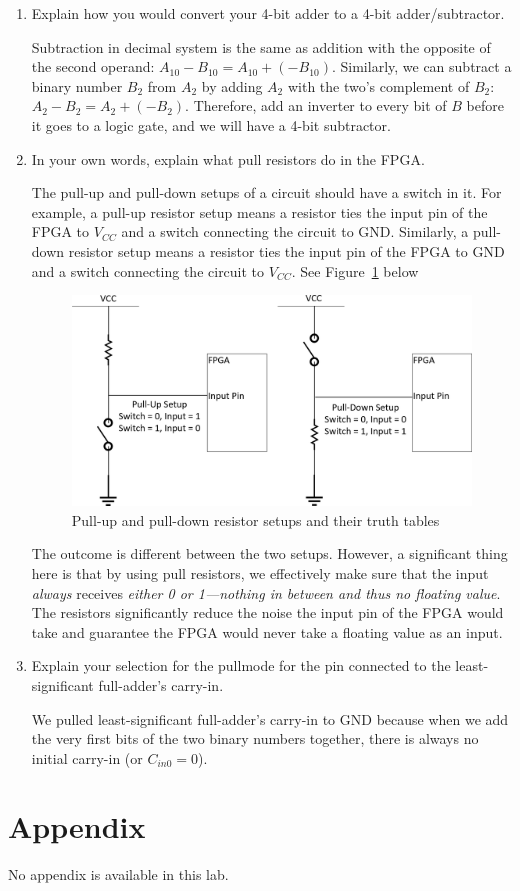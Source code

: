 \documentclass[12pt]{article}
\begin{document}
\begin{enumerate}
  \item Explain how you would convert your 4-bit adder to a 4-bit adder/subtractor.

  Subtraction in decimal system is the same as addition with the opposite of the second operand: $A_{10} - B_{10} = A_{10} + (-B_{10})$. Similarly, we can subtract a binary number $B_2$ from $A_2$ by adding $A_2$ with the two's complement of $B_2$: $A_2 - B_2 = A_2 + (-B_2)$. Therefore, add an inverter to every bit of $B$ before it goes to a logic gate, and we will have a 4-bit subtractor.

  \item In your own words, explain what pull resistors do in the FPGA.

  The pull-up and pull-down setups of a circuit should have a switch in it. For example, a pull-up resistor setup means a resistor ties the input pin of the FPGA to $V_{CC}$ and a switch connecting the circuit to GND. Similarly, a pull-down resistor setup means a resistor ties the input pin of the FPGA to GND and a switch connecting the circuit to $V_{CC}$. See Figure~\ref{figure:5} below

  \begin{figure}[h]
    \centering
    \includegraphics[width=\textwidth]{pull_resistor_setups.png}
    \caption{Pull-up and pull-down resistor setups and their truth tables}
    \label{figure:5}
  \end{figure}

  The outcome is different between the two setups. However, a significant thing here is that by using pull resistors, we effectively make sure that the input \textit{always} receives \textit{either 0 or 1---nothing in between and thus no floating value}. The resistors significantly reduce the noise the input pin of the FPGA would take and guarantee the FPGA would never take a floating value as an input.

  \item Explain your selection for the pullmode for the pin connected to the least-significant full-adder's carry-in.

  We pulled least-significant full-adder's carry-in to GND because when we add the very first bits of the two binary numbers together, there is always no initial carry-in (or $C_{in0} = 0$).
\end{enumerate}

\section*{Appendix}

No appendix is available in this lab.
\end{document}
